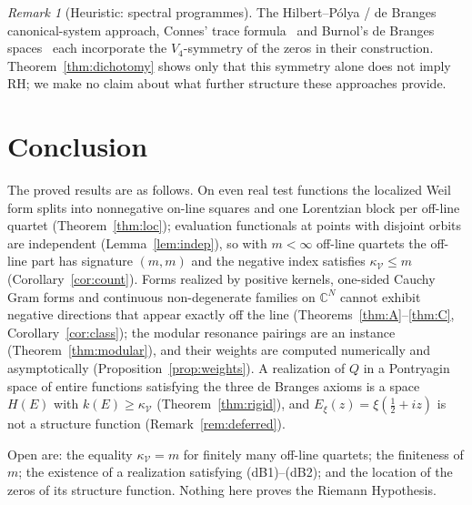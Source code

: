 \documentclass[11pt]{amsart}
\theoremstyle{definition}
\theoremstyle{remark}
\newtheorem{remark}[theorem]{Remark}
\newcommand{\RH}{\mathrm{RH}}
\newcommand{\half}{\tfrac12}
\newcommand{\kV}{\kappa_{\mathcal V}}
\begin{document}
\begin{remark}[Heuristic: spectral programmes]\label{cor:converge}
The Hilbert--P\'olya / de Branges canonical-system approach, Connes' trace
formula~\cite{Connes99} and Burnol's de Branges spaces~\cite{Burnol} each incorporate the
$V_4$-symmetry of the zeros in their construction. Theorem~\ref{thm:dichotomy} shows only that
this symmetry alone does not imply $\RH$; we make no claim about what further structure these
approaches provide.
\end{remark}

\section{Conclusion}

The proved results are as follows. On even real test functions the localized Weil form splits into
nonnegative on-line squares and one Lorentzian block per off-line quartet
(Theorem~\ref{thm:loc}); evaluation functionals at points with disjoint orbits are independent
(Lemma~\ref{lem:indep}), so with $m<\infty$ off-line quartets the off-line part has signature
$(m,m)$ and the negative index satisfies $\kV\le m$ (Corollary~\ref{cor:count}). Forms realized by
positive kernels, one-sided Cauchy Gram forms and continuous non-degenerate families on
$\mathbb C^N$ cannot exhibit negative directions that appear exactly off the line
(Theorems~\ref{thm:A}--\ref{thm:C}, Corollary~\ref{cor:class}); the modular resonance pairings are
an instance (Theorem~\ref{thm:modular}), and their weights are computed numerically and
asymptotically (Proposition~\ref{prop:weights}). A realization of $Q$ in a Pontryagin space of
entire functions satisfying the three de Branges axioms is a space $H(E)$ with $k(E)\ge\kV$
(Theorem~\ref{thm:rigid}), and $E_\xi(z)=\xi(\half+iz)$ is not a structure function
(Remark~\ref{rem:deferred}).

Open are: the equality $\kV=m$ for finitely many off-line quartets; the finiteness of $m$; the
existence of a realization satisfying (dB1)--(dB2); and the location of the zeros of its
structure function. Nothing here proves the Riemann Hypothesis.
\end{document}
